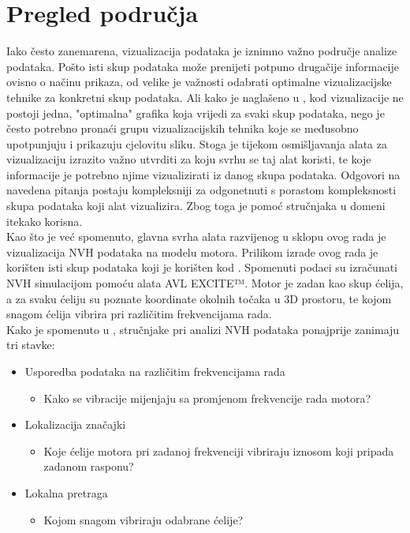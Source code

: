 \documentclass[times, utf8, diplomski]{fer}
\begin{document}
\chapter{Pregled područja}
Iako često zanemarena, vizualizacija podataka je iznimno važno područje analize podataka. Pošto isti skup podataka može prenijeti potpuno drugačije informacije ovisno o načinu prikaza, od velike je važnosti odabrati optimalne vizualizacijske tehnike za konkretni skup podataka. Ali kako je naglašeno u \citep{Unwin2020Why}, kod vizualizacije ne postoji jedna, "optimalna" grafika koja vrijedi za svaki skup podataka, nego je često potrebno pronaći grupu vizualizacijskih tehnika koje se međusobno upotpunjuju i prikazuju cjelovitu sliku. Stoga je tijekom osmišljavanja alata za vizualizaciju izrazito važno utvrditi za koju svrhu se taj alat koristi, te koje informacije je potrebno njime vizualizirati iz danog skupa podataka. Odgovori na navedena pitanja postaju kompleksniji za odgonetnuti s porastom kompleksnosti skupa podataka koji alat vizualizira. Zbog toga je pomoć stručnjaka u domeni itekako korisna.\\

Kao što je već spomenuto, glavna svrha alata razvijenog u sklopu ovog rada je vizualizacija NVH podataka na modelu motora. Prilikom izrade ovog rada je korišten isti skup podataka koji je korišten kod \citep{matkovic2021getting}. Spomenuti podaci su izračunati NVH simulacijom pomoću alata AVL EXCITE™\citep{avlEXCITE}. Motor je zadan kao skup ćelija, a za svaku ćeliju su poznate koordinate okolnih točaka u 3D prostoru, te kojom snagom ćelija vibrira pri različitim frekvencijama rada.\\

Kako je spomenuto u \citep{matkovic2021getting}, stručnjake pri analizi NVH podataka ponajprije zanimaju tri stavke:

\begin{itemize}
\item Usporedba podataka na različitim frekvencijama rada
	\begin{itemize}
	\item Kako se vibracije mijenjaju sa promjenom frekvencije rada motora?
	\end{itemize} 
\item Lokalizacija značajki
	\begin{itemize}
	\item Koje ćelije motora pri zadanoj frekvenciji vibriraju iznosom koji pripada zadanom rasponu?
	\end{itemize} 
\item Lokalna pretraga
	\begin{itemize}
	\item Kojom snagom vibriraju odabrane ćelije?\\
	\end{itemize} 
\end{itemize}
\end{document}
